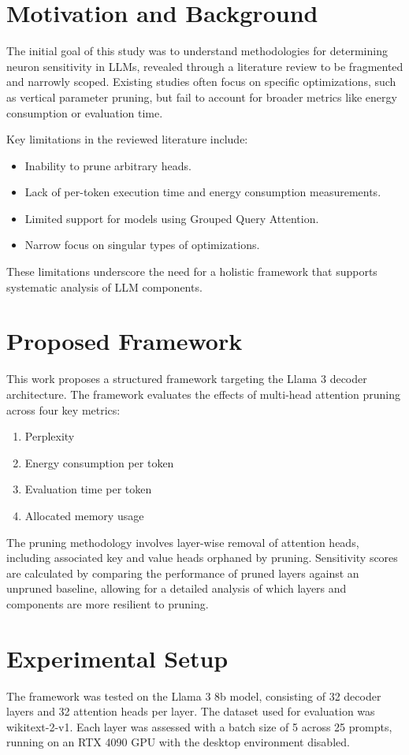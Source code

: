 \documentclass[conference]{IEEEtran}
\begin{document}
    \section{Motivation and Background}
    The initial goal of this study was to understand methodologies for determining neuron sensitivity in LLMs, revealed through a literature review to be fragmented and narrowly scoped. Existing studies often focus on specific optimizations, such as vertical parameter pruning, but fail to account for broader metrics like energy consumption or evaluation time.

    Key limitations in the reviewed literature include:
    \begin{itemize}
        \item Inability to prune arbitrary heads.
        \item Lack of per-token execution time and energy consumption measurements.
        \item Limited support for models using Grouped Query Attention.
        \item Narrow focus on singular types of optimizations.
    \end{itemize}
    These limitations underscore the need for a holistic framework that supports systematic analysis of LLM components.

    \section{Proposed Framework}
    This work proposes a structured framework targeting the Llama 3 decoder architecture. The framework evaluates the effects of multi-head attention pruning across four key metrics:
    \begin{enumerate}
        \item Perplexity
        \item Energy consumption per token
        \item Evaluation time per token
        \item Allocated memory usage
    \end{enumerate}

    The pruning methodology involves layer-wise removal of attention heads, including associated key and value heads orphaned by pruning. Sensitivity scores are calculated by comparing the performance of pruned layers against an unpruned baseline, allowing for a detailed analysis of which layers and components are more resilient to pruning.

    \section{Experimental Setup}
    The framework was tested on the Llama 3 8b model, consisting of 32 decoder layers and 32 attention heads per layer. The dataset used for evaluation was wikitext-2-v1. Each layer was assessed with a batch size of 5 across 25 prompts, running on an RTX 4090 GPU with the desktop environment disabled.
\end{document}
